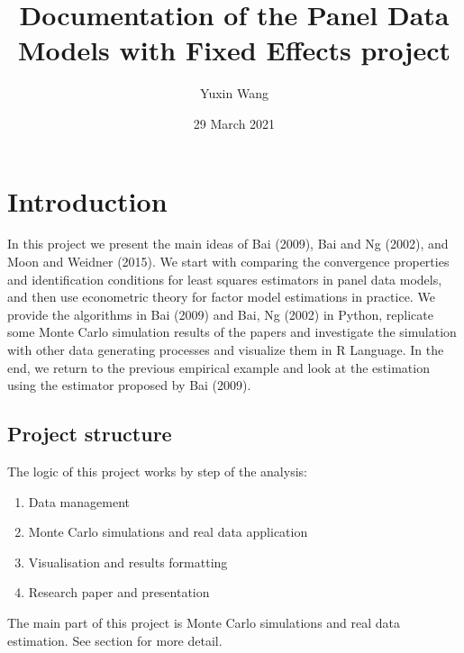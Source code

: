 \documentclass[a4paper,11pt,english]{sphinxmanual}
\title{Documentation of the Panel Data Models with Fixed Effects project}
\date{29 March 2021}
\author{Yuxin Wang}
\begin{document}
\pagestyle{empty}
\sphinxmaketitle
\pagestyle{plain}
\sphinxtableofcontents
\pagestyle{normal}
\label{\detokenize{index::doc}}



\chapter{Introduction}
\label{\detokenize{introduction:introduction}}\label{\detokenize{introduction:id1}}\label{\detokenize{introduction::doc}}
\sphinxAtStartPar
In this project we present the main ideas of Bai (2009), Bai and Ng (2002), and Moon and Weidner (2015). We start with comparing the convergence properties and identification conditions for least squares estimators in panel data models, and then use econometric theory for factor model estimations in practice. We provide the algorithms in Bai (2009) and Bai, Ng (2002) in Python, replicate some Monte Carlo simulation results of the papers and investigate the simulation with other data generating processes and visualize them in R Language. In the end, we return to the previous empirical example and look at the estimation using the estimator proposed by Bai (2009).


\section{Project structure}
\label{\detokenize{introduction:project-structure}}\label{\detokenize{introduction:id2}}
\sphinxAtStartPar
The logic of this project works by step of the analysis:
\begin{enumerate}
%
\item {} 
\sphinxAtStartPar
Data management

\item {} 
\sphinxAtStartPar
Monte Carlo simulations and real data application

\item {} 
\sphinxAtStartPar
Visualisation and results formatting

\item {} 
\sphinxAtStartPar
Research paper and presentation

\end{enumerate}

\sphinxAtStartPar
The main part of this project is Monte Carlo simulations and real data estimation. See section {\hyperref[\detokenize{analysis:monte-carlo-simulations-and-real-data-application}]{}} for more detail.
\end{document}
